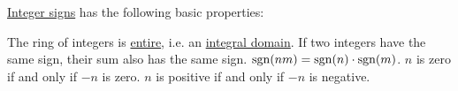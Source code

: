 \begin{proposition}\label{thm:def:integer_signum}
  \hyperref[def:integer_signum]{Integer signs} has the following basic properties:
  \begin{thmenum}
     The ring of integers is \hyperref[def:divisibility/zero]{entire}, i.e. an \hyperref[def:integral_domain]{integral domain}.
     If two integers have the same sign, their sum also has the same sign.
     \( \operatorname{sgn}(nm) = \operatorname{sgn}(n) \cdot \operatorname{sgn}(m) \).
     \( n \) is zero if and only if \( -n \) is zero.
     \( n \) is positive if and only if \( -n \) is negative.
  \end{thmenum}
\end{proposition}
